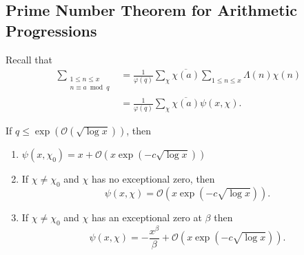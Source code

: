 \documentclass{article}
\newcommand{\1}{\mathbbm{1}}
\newcommand{\bigO}{\mathcal{O}}
\begin{document}
\subsection{Prime Number Theorem for Arithmetic Progressions}
Recall that
\begin{align*}
  \sum_{\substack{1 \leq n \leq x \\ n \equiv a \bmod{q}}} &= \frac{1}{\varphi(q)} \sum_\chi \overline{\chi(a)} \sum_{1 \leq n \leq x} \Lambda(n) \chi(n) \\
                                                           &= \frac{1}{\varphi(q)} \sum_\chi \overline{\chi(a)} \psi(x,\chi).
\end{align*}
\begin{thm}
  If $q \leq \exp(\bigO(\sqrt{\log x}))$, then
  \begin{enumerate}
    \item $\psi(x,\chi_0) = x + \bigO(x \exp(-c \sqrt{\log x}))$
    \item If $\chi \neq \chi_0$ and $\chi$ has no exceptional zero, then
      \begin{equation*}
        \psi(x,\chi) = \bigO(x \exp(-c \sqrt{\log x} ))
      .\end{equation*}
    \item If $\chi \neq \chi_0$ and $\chi$ has an exceptional zero at $\beta$ then
      \begin{equation*}
        \psi(x,\chi) = -\frac{x^\beta}{\beta} + \bigO(x \exp(-c\sqrt{\log x} ))
      .\end{equation*}
  \end{enumerate}
\end{thm}
\end{document}
